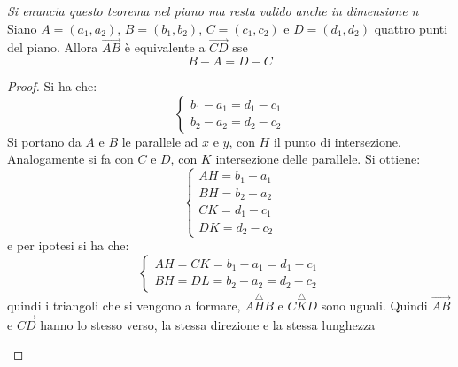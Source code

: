 \documentclass[a4paper,12pt, oneside]{book}
\begin{document}
\newpage
\begin{teorema}
\textit{Si enuncia questo teorema nel piano ma resta valido anche in dimensione n}\\
Siano $A=(a_1,a_2)$, $B=(b_1,b_2)$, $C=(c_1,c_2)$ e $D=(d_1,d_2)$ quattro punti del piano. Allora $\vec{AB}$ è equivalente a $\vec{CD}$ sse $$B-A=D-C$$
\end{teorema}
\begin{proof}
Si ha che:
$$\begin{cases}
b_1-a_1=d_1-c_1\\
b_2-a_2=d_2-c_2
\end{cases}$$
Si portano da $A$ e $B$ le parallele ad $x$ e $y$, con $H$ il punto di intersezione. Analogamente si fa con $C$ e $D$, con $K$ intersezione delle parallele. Si ottiene:
$$\begin{cases}
AH=b_1-a_1\\
BH=b_2-a_2\\
CK=d_1-c_1\\
DK=d_2-c_2
\end{cases}$$
e per ipotesi si ha che:
$$\begin{cases}
AH=CK=b_1-a_1=d_1-c_1\\
BH=DL=b_2-a_2=d_2-c_2
\end{cases}$$
quindi i triangoli che si vengono a formare, $A\overset{\triangle}{H}B$ e $C\overset{\triangle}{K}D$ sono uguali. Quindi $\vec{AB}$ e $\vec{CD}$ hanno lo stesso verso, la stessa direzione e la stessa lunghezza
\begin{center}


\end{center}
\end{proof}
\end{document}
